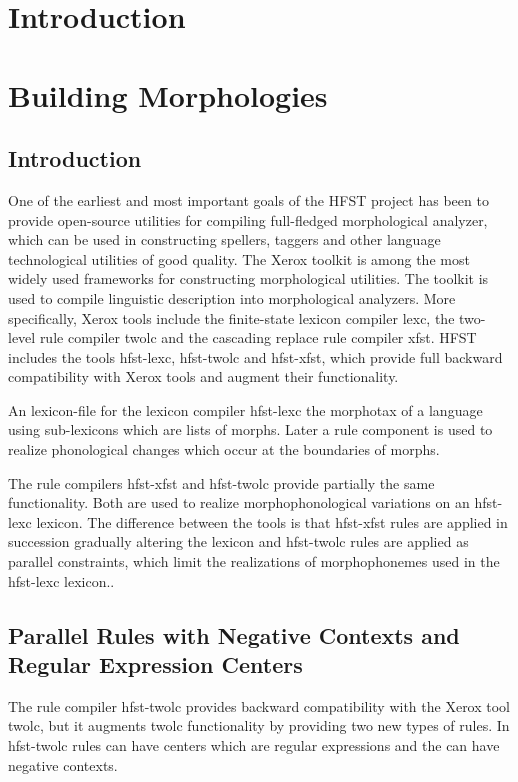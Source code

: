 \documentclass{llncs}
\begin{document}
\section*{Introduction}

\section{Building Morphologies}

\subsection{Introduction}

One of the earliest and most important goals of the HFST project has
been to provide open-source utilities for compiling full-fledged
morphological analyzer, which can be used in constructing spellers,
taggers and other language technological utilities of good
quality. The Xerox toolkit \cite{beesley/2003} is among the most
widely used frameworks for constructing morphological utilities. The
toolkit is used to compile linguistic description into morphological
analyzers. More specifically, Xerox tools include the finite-state
lexicon compiler lexc, the two-level rule compiler twolc and the
cascading replace rule compiler xfst. HFST includes the tools
hfst-lexc, hfst-twolc and hfst-xfst, which provide full backward
compatibility with Xerox tools and augment their functionality.

An lexicon-file for the lexicon compiler hfst-lexc the morphotax of a
language using sub-lexicons which are lists of morphs. Later a rule
component is used to realize phonological changes which occur at the
boundaries of morphs.

The rule compilers hfst-xfst and hfst-twolc provide partially the same
functionality. Both are used to realize morphophonological variations
on an hfst-lexc lexicon. The difference between the tools is that
hfst-xfst rules are applied in succession gradually altering the
lexicon and hfst-twolc rules are applied as parallel constraints,
which limit the realizations of morphophonemes used in the hfst-lexc
lexicon..

\subsection{Parallel Rules with Negative Contexts and Regular Expression Centers}

The rule compiler hfst-twolc provides backward compatibility with the
Xerox tool twolc, but it augments twolc functionality by providing two
new types of rules. In hfst-twolc rules can have centers which are
regular expressions and the can have negative contexts.
\end{document}
